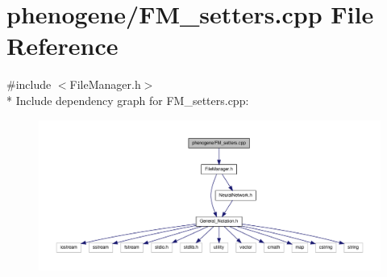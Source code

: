\hypertarget{a00007}{\section{phenogene/\-F\-M\-\_\-setters.cpp File Reference}
\label{de/d5e/a00007}
}
{\ttfamily \#include $<$File\-Manager.\-h$>$}\\*
Include dependency graph for F\-M\-\_\-setters.\-cpp\-:
\nopagebreak
\begin{figure}[H]
\begin{center}
\leavevmode
\includegraphics[width=350pt]{d3/dfe/a00025}
\end{center}
\end{figure}

